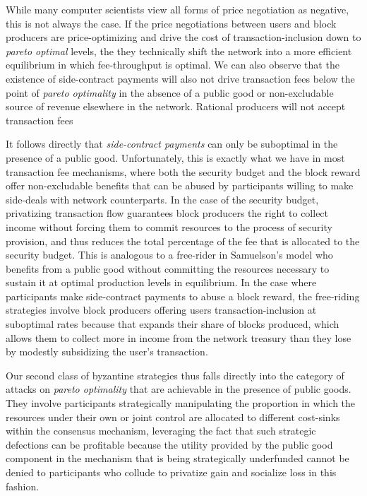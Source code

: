 \documentclass[sigconf,anonymous]{aamas}
\begin{document}
While many computer scientists view all forms of price negotiation as negative, this is not always the case. If the price negotiations between users and block producers are price-optimizing and drive the cost of transaction-inclusion down to \textit{pareto optimal} levels, the they technically shift the network into a more efficient equilibrium in which fee-throughput is optimal. We can also observe that the existence of side-contract payments will also not drive transaction fees below the point of \textit{pareto optimality} in the absence of a public good or non-excludable source of revenue elsewhere in the network. Rational producers will not accept transaction fees

It follows directly that \textit{side-contract payments} can only be suboptimal in the presence of a public good. Unfortunately, this is exactly what we have in most transaction fee mechanisms, where both the security budget and the block reward offer non-excludable benefits that can be abused by participants willing to make side-deals with network counterparts. In the case of the security budget, privatizing transaction flow guarantees block producers the right to collect income without forcing them to commit resources to the process of security provision, and thus reduces the total percentage of the fee that is allocated to the security budget. This is analogous to a free-rider in Samuelson's model who benefits from a public good without committing the resources necessary to sustain it at optimal production levels in equilibrium. In the case where participants make side-contract payments to abuse a block reward, the free-riding strategies involve block producers offering users transaction-inclusion at suboptimal rates because that expands their share of blocks produced, which allows them to collect more in income from the network treasury than they lose by modestly subsidizing the user's transaction.

Our second class of byzantine strategies thus falls directly into the category of attacks on \textit{pareto optimality} that are achievable in the presence of public goods. They involve participants strategically manipulating the proportion in which the resources under their own or joint control are allocated to different cost-sinks within the consensus mechanism, leveraging the fact that such strategic defections can be profitable because the utility provided by the public good component in the mechanism that is being strategically underfunded cannot be denied to participants who collude to privatize gain and socialize loss in this fashion.
\end{document}
